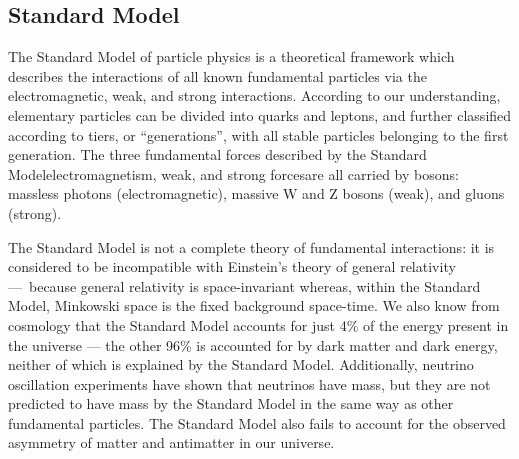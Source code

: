 \subsection{Standard Model}
The Standard Model of particle physics is a theoretical framework which describes the interactions of all known fundamental particles via the electromagnetic, weak, and strong interactions. According to our understanding, elementary particles can be divided into quarks and leptons, and further classified according to tiers, or ``generations'', with all stable particles belonging to the first generation. The three fundamental forces described by the Standard Model\textemdash electromagnetism, weak, and strong forces\textemdash are all carried by bosons: massless photons (electromagnetic), massive W and Z bosons (weak), and gluons (strong)\cite{CERN:SM:Online}.

The Standard Model is not a complete theory of fundamental interactions: it is considered to be incompatible with Einstein's theory of general relativity — because general relativity is space-invariant whereas, within the Standard Model, Minkowski space is the fixed background space-time\cite{Colosi:2005:CQG}. We also know from cosmology that the Standard Model accounts for just 4\% of the energy present in the universe — the other 96\% is accounted for by dark matter and dark energy, neither of which is explained by the Standard Model\cite{Krauss:2009:Conference}. Additionally, neutrino oscillation experiments have shown that neutrinos have mass\cite{Fukuda:1998:Kamiokande}, but they are not predicted to have mass by the Standard Model in the same way as other fundamental particles. The Standard Model also fails to account for the observed asymmetry of matter and antimatter in our universe\cite{Sather:1999:MatterA}.

